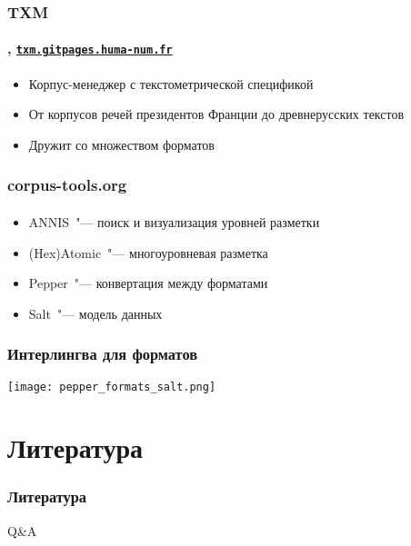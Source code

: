 
\begin{frame}
    \frametitle{TXM}
    \framesubtitle{\autocite{heiden:2010}, \href{https://txm.gitpages.huma-num.fr/textometrie/en/index.html}{\texttt{txm.gitpages.huma-num.fr}}}

    \begin{itemize}
        \item Корпус-менеджер с текстометрической спецификой
        \item От корпусов речей президентов Франции до древнерусских текстов
        \item Дружит со множеством форматов
    \end{itemize}
\end{frame}

\begin{frame}
    \frametitle{corpus-tools.org}
    \framesubtitle{\autocite{corpus_tools}}

    \begin{itemize}
        \item ANNIS~"--- поиск и визуализация уровней разметки
        \item (Hex)Atomic~"--- многоуровневая разметка
        \item Pepper~"--- конвертация между форматами
        \item Salt~"--- модель данных
    \end{itemize}
\end{frame}

\begin{frame}
    \frametitle{Интерлингва для форматов}
    \centering
    \texttt{[image: pepper\_formats\_salt.png]}
\end{frame}

\section{Литература}

\frame{\tableofcontents[currentsection]}

\begin{frame}[allowframebreaks]
    \frametitle{Литература}
    \nocite{*}
    \printbibliography
\end{frame}

\begin{frame}{}
    \centering

    \vfill
    Q\&A
    \vfill
\end{frame}


